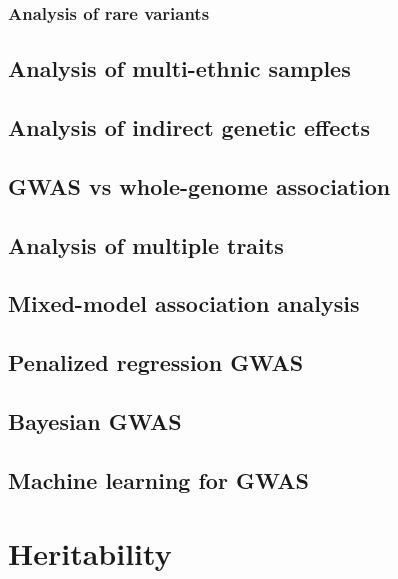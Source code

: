 \documentclass[]{book}
\theoremstyle{definition}
\theoremstyle{definition}
\theoremstyle{definition}
\theoremstyle{remark}
\begin{document}
\subsection{Analysis of rare
variants}\label{analysis-of-rare-variants-1}

\section{Analysis of multi-ethnic
samples}\label{analysis-of-multi-ethnic-samples}

\section{Analysis of indirect genetic
effects}\label{analysis-of-indirect-genetic-effects}

\section{GWAS vs whole-genome
association}\label{gwas-vs-whole-genome-association}

\section{Analysis of multiple traits}\label{analysis-of-multiple-traits}

\section{Mixed-model association
analysis}\label{mixed-model-association-analysis}

\section{Penalized regression GWAS}\label{penalized-regression-gwas}

\section{Bayesian GWAS}\label{bayesian-gwas}

\section{Machine learning for GWAS}\label{machine-learning-for-gwas}

\chapter{Heritability}\label{heritability}
\end{document}
